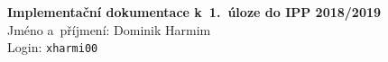 \documentclass[10pt, a4paper]{article}
\begin{document}
    {\parindent 0pt \Large
        \textbf{Implementační dokumentace k~1.~úloze do IPP 2018/2019} \\
        Jméno a~příjmení: Dominik Harmim \\
        Login: \texttt{xharmi00}
    }
\end{document}
